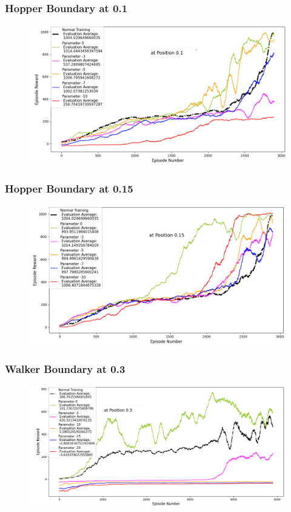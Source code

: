 \documentclass{beamer}
\begin{document}
\begin{frame}
\frametitle{Hopper Boundary at 0.1}
\begin{figure}
    \centering
	\includegraphics[scale=0.4]{Hopper_with_Boundary_at_0.1}
\end{figure}
\end{frame}

\begin{frame}
\frametitle{Hopper Boundary at 0.15}
\begin{figure}
    \centering
	\includegraphics[scale=0.4]{Hopper_with_Boundary_at_0.15}
\end{figure}
\end{frame}



\begin{frame}
\frametitle{Walker Boundary at 0.3}
\begin{figure}
    \centering
	\includegraphics[scale=0.35]{Walker_with_Boundary_at_0.3}
\end{figure}
\end{frame}
\end{document}
